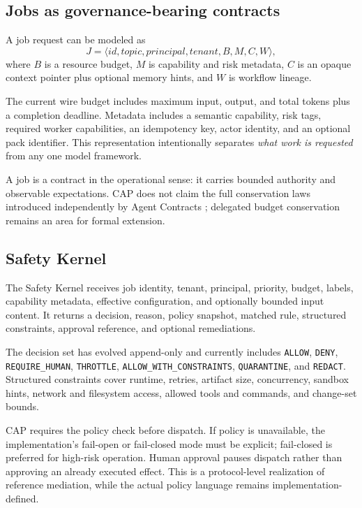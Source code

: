 \subsection{Jobs as governance-bearing contracts}

A job request can be modeled as
\begin{equation}
J = \langle id, topic, principal, tenant, B, M, C, W \rangle,
\end{equation}
where $B$ is a resource budget, $M$ is capability and risk metadata, $C$ is an opaque context pointer plus optional memory hints, and $W$ is workflow lineage.

The current wire budget includes maximum input, output, and total tokens plus a completion deadline. Metadata includes a semantic capability, risk tags, required worker capabilities, an idempotency key, actor identity, and an optional pack identifier. This representation intentionally separates \emph{what work is requested} from any one model framework.

A job is a contract in the operational sense: it carries bounded authority and observable expectations. CAP does not claim the full conservation laws introduced independently by Agent Contracts \citep{ye2026agentcontracts}; delegated budget conservation remains an area for formal extension.

\subsection{Safety Kernel}

The Safety Kernel receives job identity, tenant, principal, priority, budget, labels, capability metadata, effective configuration, and optionally bounded input content. It returns a decision, reason, policy snapshot, matched rule, structured constraints, approval reference, and optional remediations.

The decision set has evolved append-only and currently includes \texttt{ALLOW}, \texttt{DENY}, \texttt{REQUIRE\_HUMAN}, \texttt{THROTTLE}, \texttt{ALLOW\_WITH\_CONSTRAINTS}, \texttt{QUARANTINE}, and \texttt{REDACT}. Structured constraints cover runtime, retries, artifact size, concurrency, sandbox hints, network and filesystem access, allowed tools and commands, and change-set bounds.

CAP requires the policy check before dispatch. If policy is unavailable, the implementation's fail-open or fail-closed mode must be explicit; fail-closed is preferred for high-risk operation. Human approval pauses dispatch rather than approving an already executed effect. This is a protocol-level realization of reference mediation, while the actual policy language remains implementation-defined.

